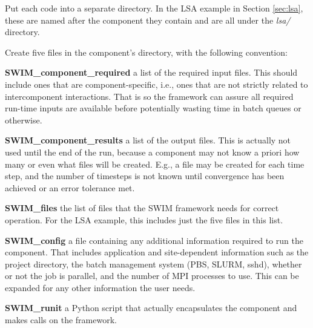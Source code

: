 \begin{enumerator}
    \item Put each code into a separate directory. 
        In the LSA example in
        Section \ref{sec:lsa}, these are
        named after the component they contain and are all under the {\em lsa/}
      directory.

    \item Create five files in the component's directory, with the following
      convention:

        \begin{enumerator}
        \item {\bf SWIM\_component\_required} a list of the required input files.
           This should include ones that are component-specific, i.e., ones
           that are not strictly related to intercomponent interactions.
           That is so the framework can assure all required run-time inputs
           are available before potentially wasting time in batch queues or
           otherwise.

       \item {\bf SWIM\_component\_results} a list of the output files. This is
           actually not used until the end of the run, because a component
           may not know a priori how many or even what files will be
           created. E.g., a file may be created for each time step, and the
           number of timesteps is not known until convergence has been
           achieved or an error tolerance met.

       \item {\bf SWIM\_files} the list of files that the SWIM framework needs for
           correct operation. For the LSA example, this includes just the
           five files in this list.

       \item {\bf SWIM\_config} a file containing any additional information
           required to run the component. That includes application and
           site-dependent information such as the project directory, the
           batch management system (PBS, SLURM, sshd), whether or not the
           job is parallel, and the number of MPI processes to use. This
           can be expanded for any other information the user needs.

       \item {\bf SWIM\_runit} a Python script that actually encapsulates the
           component and makes calls on the framework.
       \end{enumerator}

\end{enumerator}

